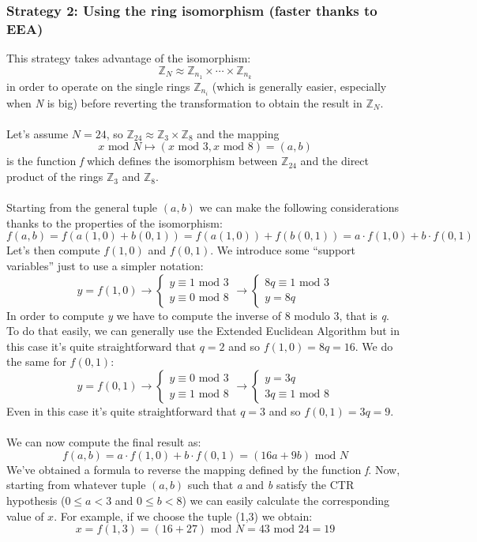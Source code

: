 \documentclass[11pt, a4paper]{article}
\newcommand{\doublequotes}[1]{“#1”}
\newcommand{\mymod}{
    \text{ mod }
}
\begin{document}
\subsubsection*{Strategy 2: Using the ring isomorphism (faster thanks to EEA)}
This strategy takes advantage of the isomorphism:
$$\mathbb{Z}_N\approx\mathbb{Z}_{n_1}\times\cdots\times\mathbb{Z}_{n_k}$$
in order to operate on the single rings $\mathbb{Z}_{n_i}$ (which is generally easier, especially when \textit{N} is big) before reverting the transformation to obtain the result in $\mathbb{Z}_N$.\\\\
Let's assume $N=24$, so $\mathbb{Z}_{24}\approx\mathbb{Z}_3\times\mathbb{Z}_8$ and the mapping
$$x\mymod N\mapsto (x\mymod3, x\mymod8)=(a,b)$$
is the function \textit{f} which defines the isomorphism between $\mathbb{Z}_{24}$ and the direct product of the rings $\mathbb{Z}_3$ and $\mathbb{Z}_8$.\\\\
Starting from the general tuple $(a,b)$ we can make the following considerations thanks to the properties of the isomorphism:
$$f(a,b)=f\left(a(1,0)+b(0,1)\right)=f(a(1,0))+f(b(0,1))=a\cdot f(1,0)+b\cdot f(0,1)$$
Let's then compute $f(1,0)$ and $f(0,1)$. We introduce some \doublequotes{support variables} just to use a simpler notation:
\begin{equation*}
  y=f(1,0)\longrightarrow
  \begin{cases}
      y\equiv1\mymod3\\
      y\equiv0\mymod8
  \end{cases}\longrightarrow
  \begin{cases}
      8q\equiv1\mymod3\\
      y=8q
  \end{cases}
\end{equation*}
In order to compute \textit{y} we have to compute the inverse of 8 modulo 3, that is \textit{q}. To do that easily, we can generally use the Extended Euclidean Algorithm but in this case it's quite straightforward that $q=2$ and so $f(1,0)=8q=16$. We do the same for $f(0,1)$:
\begin{equation*}
  y=f(0,1)\longrightarrow
  \begin{cases}
      y\equiv0\mymod3\\
      y\equiv1\mymod8
  \end{cases}\longrightarrow
  \begin{cases}
      y=3q\\
      3q\equiv1\mymod8
  \end{cases}
\end{equation*}
Even in this case it's quite straightforward that $q=3$ and so $f(0,1)=3q=9$.\\\\
We can now compute the final result as:
$$f(a,b)=a\cdot f(1,0)+b\cdot f(0,1)=(16a+9b) \mymod N$$
We've obtained a formula to reverse the mapping defined by the function \textit{f}. Now, starting from whatever tuple $(a,b)$ such that \textit{a} and \textit{b} satisfy the CTR hypothesis ($0\le a<3$ and $0\le b<8$) we can easily calculate the corresponding value of $x$. For example, if we choose the tuple (1,3) we obtain:
$$x=f(1,3)=(16+27)\mymod N=43\mymod 24=19$$
\end{document}
